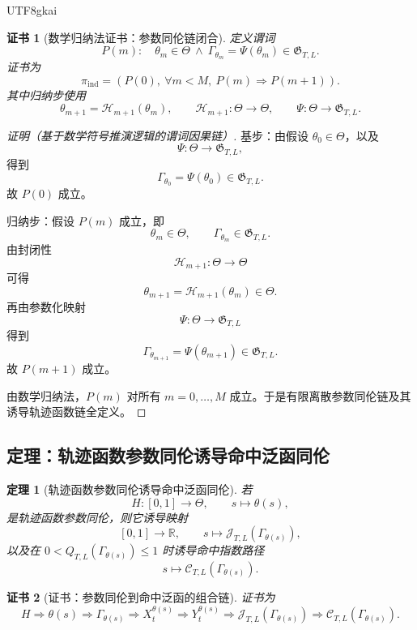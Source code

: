 \documentclass[12pt]{article}
\newtheorem{theorem}{定理}[section]
\newtheorem{Certificate}{证书}[section]
\newcommand{\RR}{\mathbb{R}}
\begin{document}
\begin{CJK*}{UTF8}{gkai}
\begin{Certificate}[数学归纳法证书：参数同伦链闭合]
\label{cert:tex57-discrete-chain}
定义谓词
\[
  P(m):\quad
  \theta_m\in\Theta
  \ \wedge\
  \Gamma_{\theta_m}=\Psi(\theta_m)\in\mathfrak G_{T,L}.
\]
证书为
\[
  \pi_{\mathrm{ind}}
  =
  \left(
  P(0),\
  \forall m<M,\ P(m)\Rightarrow P(m+1)
  \right).
\]
其中归纳步使用
\[
  \theta_{m+1}=\mathscr H_{m+1}(\theta_m),
  \qquad
  \mathscr H_{m+1}:\Theta\to\Theta,
  \qquad
  \Psi:\Theta\to\mathfrak G_{T,L}.
\]
\end{Certificate}

\begin{proof}[证明（基于数学符号推演逻辑的谓词因果链）]
基步：由假设 \(\theta_0\in\Theta\)，以及
\[
  \Psi:\Theta\to\mathfrak G_{T,L},
\]
得到
\[
  \Gamma_{\theta_0}=\Psi(\theta_0)\in\mathfrak G_{T,L}.
\]
故 \(P(0)\) 成立。

归纳步：假设 \(P(m)\) 成立，即
\[
  \theta_m\in\Theta,
  \qquad
  \Gamma_{\theta_m}\in\mathfrak G_{T,L}.
\]
由封闭性
\[
  \mathscr H_{m+1}:\Theta\to\Theta
\]
可得
\[
  \theta_{m+1}=\mathscr H_{m+1}(\theta_m)\in\Theta.
\]
再由参数化映射
\[
  \Psi:\Theta\to\mathfrak G_{T,L}
\]
得到
\[
  \Gamma_{\theta_{m+1}}=\Psi(\theta_{m+1})\in\mathfrak G_{T,L}.
\]
故 \(P(m+1)\) 成立。

由数学归纳法，\(P(m)\) 对所有 \(m=0,\ldots,M\) 成立。于是有限离散参数同伦链及其
诱导轨迹函数链全定义。
\end{proof}

\subsection{定理：轨迹函数参数同伦诱导命中泛函同伦}
\label{subsec:tex57-induced-functional-homotopy}

\begin{theorem}[轨迹函数参数同伦诱导命中泛函同伦]
\label{thm:tex57-induced-functional-homotopy}
若
\[
  H:[0,1]\to\Theta,
  \qquad
  s\mapsto\theta(s),
\]
是轨迹函数参数同伦，则它诱导映射
\[
  [0,1]\to\RR,
  \qquad
  s\mapsto
  \mathcal J_{T,L}(\Gamma_{\theta(s)}),
\]
以及在 \(0<Q_{T,L}(\Gamma_{\theta(s)})\le1\) 时诱导命中指数路径
\[
  s\mapsto
  \mathcal C_{T,L}(\Gamma_{\theta(s)}).
\]
\end{theorem}

\begin{Certificate}[证书：参数同伦到命中泛函的组合链]
\label{cert:tex57-induced-functional-homotopy}
证书为
\[
  H
  \Longrightarrow
  \theta(s)
  \Longrightarrow
  \Gamma_{\theta(s)}
  \Longrightarrow
  X_t^{\theta(s)}
  \Longrightarrow
  Y_t^{\theta(s)}
  \Longrightarrow
  \mathcal J_{T,L}(\Gamma_{\theta(s)})
  \Longrightarrow
  \mathcal C_{T,L}(\Gamma_{\theta(s)}).
\]
\end{Certificate}


\end{CJK*}
\end{document}
